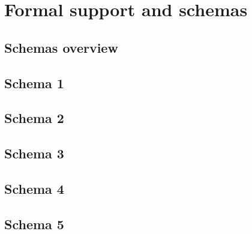 \section{Formal support and schemas}\label{sec:formal-framework}


\subsection{Schemas overview}\label{subsec:schemas-overview}


\subsection{Schema 1}\label{subsec:schema-1}


\subsection{Schema 2}\label{subsec:schema-2}


\subsection{Schema 3}\label{subsec:schema-3}


\subsection{Schema 4}\label{subsec:schema-4}


\subsection{Schema 5}\label{subsec:schema-5}

